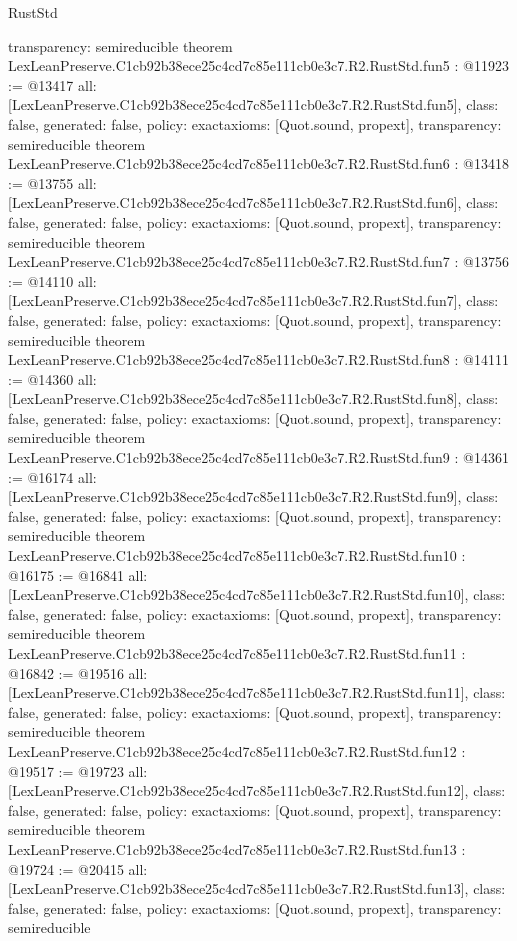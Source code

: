 \begin{lexlean}{RustStd}
\begin{coremodule}
{  transparency: semireducible
}
theorem LexLeanPreserve.C1cb92b38ece25c4cd7c85e111cb0e3c7.R2.RustStd.fun5 : @11923 := @13417 {
  all: [LexLeanPreserve.C1cb92b38ece25c4cd7c85e111cb0e3c7.R2.RustStd.fun5],
  class: false,
  generated: false,
  policy: exact{axioms: [Quot.sound, propext]},
  transparency: semireducible
}
theorem LexLeanPreserve.C1cb92b38ece25c4cd7c85e111cb0e3c7.R2.RustStd.fun6 : @13418 := @13755 {
  all: [LexLeanPreserve.C1cb92b38ece25c4cd7c85e111cb0e3c7.R2.RustStd.fun6],
  class: false,
  generated: false,
  policy: exact{axioms: [Quot.sound, propext]},
  transparency: semireducible
}
theorem LexLeanPreserve.C1cb92b38ece25c4cd7c85e111cb0e3c7.R2.RustStd.fun7 : @13756 := @14110 {
  all: [LexLeanPreserve.C1cb92b38ece25c4cd7c85e111cb0e3c7.R2.RustStd.fun7],
  class: false,
  generated: false,
  policy: exact{axioms: [Quot.sound, propext]},
  transparency: semireducible
}
theorem LexLeanPreserve.C1cb92b38ece25c4cd7c85e111cb0e3c7.R2.RustStd.fun8 : @14111 := @14360 {
  all: [LexLeanPreserve.C1cb92b38ece25c4cd7c85e111cb0e3c7.R2.RustStd.fun8],
  class: false,
  generated: false,
  policy: exact{axioms: [Quot.sound, propext]},
  transparency: semireducible
}
theorem LexLeanPreserve.C1cb92b38ece25c4cd7c85e111cb0e3c7.R2.RustStd.fun9 : @14361 := @16174 {
  all: [LexLeanPreserve.C1cb92b38ece25c4cd7c85e111cb0e3c7.R2.RustStd.fun9],
  class: false,
  generated: false,
  policy: exact{axioms: [Quot.sound, propext]},
  transparency: semireducible
}
theorem LexLeanPreserve.C1cb92b38ece25c4cd7c85e111cb0e3c7.R2.RustStd.fun10 : @16175 := @16841 {
  all: [LexLeanPreserve.C1cb92b38ece25c4cd7c85e111cb0e3c7.R2.RustStd.fun10],
  class: false,
  generated: false,
  policy: exact{axioms: [Quot.sound, propext]},
  transparency: semireducible
}
theorem LexLeanPreserve.C1cb92b38ece25c4cd7c85e111cb0e3c7.R2.RustStd.fun11 : @16842 := @19516 {
  all: [LexLeanPreserve.C1cb92b38ece25c4cd7c85e111cb0e3c7.R2.RustStd.fun11],
  class: false,
  generated: false,
  policy: exact{axioms: [Quot.sound, propext]},
  transparency: semireducible
}
theorem LexLeanPreserve.C1cb92b38ece25c4cd7c85e111cb0e3c7.R2.RustStd.fun12 : @19517 := @19723 {
  all: [LexLeanPreserve.C1cb92b38ece25c4cd7c85e111cb0e3c7.R2.RustStd.fun12],
  class: false,
  generated: false,
  policy: exact{axioms: [Quot.sound, propext]},
  transparency: semireducible
}
theorem LexLeanPreserve.C1cb92b38ece25c4cd7c85e111cb0e3c7.R2.RustStd.fun13 : @19724 := @20415 {
  all: [LexLeanPreserve.C1cb92b38ece25c4cd7c85e111cb0e3c7.R2.RustStd.fun13],
  class: false,
  generated: false,
  policy: exact{axioms: [Quot.sound, propext]},
  transparency: semireducible
}
\end{coremodule}
\end{lexlean}
